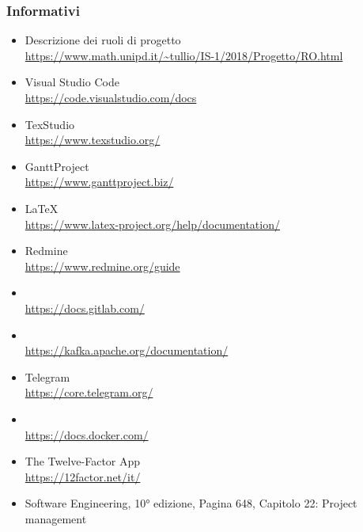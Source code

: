     \subsubsection{Informativi}	\label{rifinfo}
    \begin{itemize}
        \item Descrizione dei ruoli di progetto \\\url{https://www.math.unipd.it/~tullio/IS-1/2018/Progetto/RO.html}
        \item Visual Studio Code \\\url{https://code.visualstudio.com/docs}
        \item TexStudio \\\url{https://www.texstudio.org/}
        \item GanttProject \\\url{https://www.ganttproject.biz/}
		\item \LaTeX\ \\\url{https://www.latex-project.org/help/documentation/}
		\item Redmine \\\url{https://www.redmine.org/guide}
		\item {} \\\url{https://docs.gitlab.com/}
		\item {} \\\url{https://kafka.apache.org/documentation/}
		\item Telegram \\\url{https://core.telegram.org/}
		\item {} \\\url{https://docs.docker.com/}
		\item The Twelve-Factor App \\\url{https://12factor.net/it/}
        \item Software Engineering, 10° edizione,
        Pagina 648, Capitolo 22: Project management

	\end{itemize}
